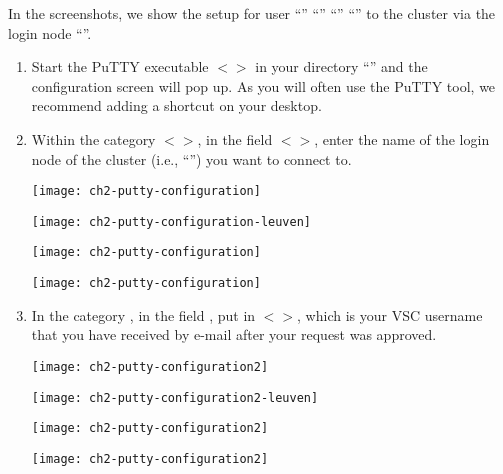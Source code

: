    In the screenshots, we show the setup for user
\ifantwerpen
``''
\fi
\ifbrussel
``''
\fi
\ifgent
``''
\fi
\ifleuven
``''
\fi
  to the \hpc cluster via the login node
  ``\strong{\emph{\loginnode}}''.

  \begin{enumerate}
    \item  Start the PuTTY executable $<$$>$ in your
      directory ``'' and the
      configuration screen will pop up. As you will often use the PuTTY tool,
      we recommend adding a shortcut on your desktop.
    \item  Within the category $<$$>$, in the field
      $<$$>$, enter the name of the login node of the
      \hpc cluster (i.e., ``\strong{\emph{\loginnode}}'')
      you want to connect to.

\ifantwerpen
      \begin{center}
      \texttt{[image: ch2-putty-configuration]}
      \end{center}
\fi
\ifleuven
      \begin{center}
      \texttt{[image: ch2-putty-configuration-leuven]}
      \end{center}
\fi
\ifbrussel
      \begin{center}
      \texttt{[image: ch2-putty-configuration]}
      \end{center}
\fi
\ifgent
      \begin{center}
      \texttt{[image: ch2-putty-configuration]}
      \end{center}
\fi

    \item  In the category , in
      the field , put in
      $<$\emph{\userid}$>$, which is your VSC username that you have
      received by e-mail after your request was approved.

\ifantwerpen
      \begin{center}
      \texttt{[image: ch2-putty-configuration2]}
      \end{center}
\fi
\ifleuven
      \begin{center}
      \texttt{[image: ch2-putty-configuration2-leuven]}
      \end{center}
\fi
\ifbrussel
      \begin{center}
      \texttt{[image: ch2-putty-configuration2]}
      \end{center}
\fi
\ifgent
      \begin{center}
      \texttt{[image: ch2-putty-configuration2]}
      \end{center}
\fi


\end{enumerate}
